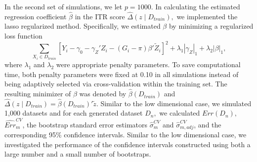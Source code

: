 \documentclass[12pt]{article}
\begin{document}
In the second set of simulations, we let $p=1000.$ In calculating the estimated regression coefficient $\hat{\beta}$ in the ITR score $\widehat{\Delta}(z\mid D_{train}),$  we implemented the lasso regularized method. Specifically, we estimated $\beta$ by minimizing a regularized loss function
$$\sum_{X_i\in D_{train}} \left[Y_i-\gamma_0-\gamma_Z'Z_i-(G_i-\pi)\beta'\tilde{Z}_i\right]^2 +\lambda_1|\gamma_Z|_1+\lambda_2|\beta|_1,$$
where $\lambda_1$ and $\lambda_2$ were appropriate penalty parameters. To save computational time, both penalty parameters were fixed at 0.10 in all simulations instead of being adaptively selected via cross-validation within the training set.  The resulting minimizer of $\beta$ was denoted by $\hat{\beta}(D_{train})$ and $\widehat{\Delta}(z\mid D_{train})=\hat{\beta}(D_{train})'\tilde{z}.$ Similar to the low dimensional case, we simulated 1,000 datasets and for each generated dataset $D_n,$ we calculated $Err(D_n),$ $\widehat{Err}_m^{CV}$, the bootstrap standard error estimators $\widehat{\sigma}_m^{CV}$ and $\widehat{\sigma}_{m,adj}^{CV}$, and the corresponding 95\% confidence intervals.  Similar to the low dimensional case, we investigated the performance of the confidence intervals constructed using both a large number and a small number of bootstraps.
\end{document}
